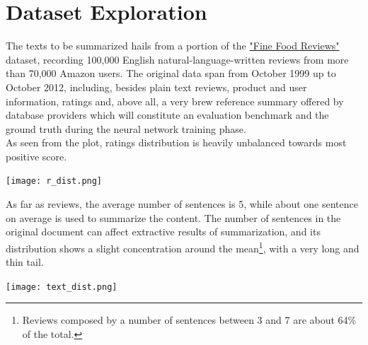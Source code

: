 \documentclass[fleqn,10pt]{SelfArx} %
\affiliation{\textsuperscript{*}\textit{Universita` degli Studi di Milano Bicocca, CdLM in Data Science}}
\begin{document}
\flushbottom %

\maketitle %

\tableofcontents %

\thispagestyle{empty} %

\newpage
\section{Dataset Exploration} 
The texts to be summarized hails from a portion of the \href{https://www.kaggle.com/snap/amazon-fine-food-reviews}{"Fine Food Reviews"} dataset, recording 100,000 English natural-language-written reviews from more than 70,000 Amazon users. The original data span from October 1999 up to October 2012, including, besides plain text reviews, product and user information, ratings and, above all, a very brew reference summary offered by database providers which will constitute an evaluation benchmark and the ground truth during the neural network training phase.\\
As seen from the plot, ratings distribution is heavily unbalanced towards most positive score.
\par
{\centering\vspace{10pt}
\texttt{[image: r\_dist.png]}
\vspace{10pt}
\par}
As far as reviews, the average number of sentences is 5, while about one sentence on average is used to summarize the content. The number of sentences in the original document can affect extractive results of summarization, and its distribution shows a slight concentration around the mean\footnote{Reviews composed by a number of sentences between 3 and 7 are about 64\% of the total.}, with a very long and thin tail.\par
{\centering\vspace{10pt}
\texttt{[image: text\_dist.png]}
\vspace{10pt}
\par}
\end{document}
